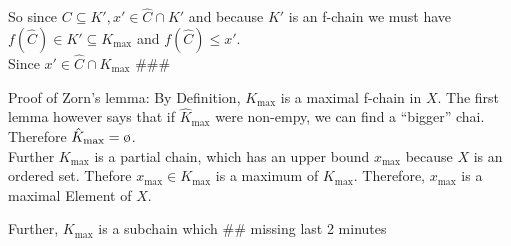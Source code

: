 So since $C \subseteq K', x' \in \hat{C} \cap K'$ and because $K'$ is an f-chain we must have $f(\hat{C}) \in K' \subseteq K_{\text{max}}$ and $f(\hat{C}) \leq x'$.\\
Since $x' \in \hat{C} \cap K_{\text{max}}$ \#\#\#


Proof of Zorn's lemma:
By Definition, $K_{\max}$ is a maximal f-chain in $X$. The first lemma however says that if $\hat{K}_{\max}$ were non-empy, we can find a ``bigger'' chai. Therefore $\hat{K}_{\max} = \es$.\\
Further $K_{\max}$ is a partial chain, which has an upper bound $x_{\max}$ because $X$ is an ordered set. Thefore $x_{\max} \in K_{\max}$ is a maximum of $K_{\max}$. Therefore, $x_{\max}$ is a maximal Element of $X$.


Further, $K_{\max}$ is a subchain which \#\# missing last 2 minutes\\


